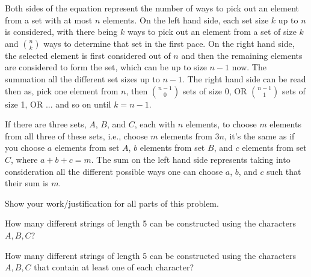 \documentclass[11pt]{article}
\begin{document}
\begin{solution}
    \begin{Parts}
        
        \Part Both sides of the equation represent the number of ways to pick out
        an element from a set with at most $n$ elements. On the left hand side, 
        each set size $k$ up to $n$ is considered, with there being $k$ ways to
        pick out an element from a set of size $k$ and $\binom{n}{k}$ ways to 
        determine that set in the first pace. On the right hand side, the selected
        element is first considered out of $n$ and then the remaining elements are
        considered to form the set, which can be up to size $n-1$ now. The
        summation all the different set sizes up to $n-1$. The right hand side can
        be read then as, pick one element from $n$, then $\binom{n-1}{0}$ sets of
        size 0, OR $\binom{n-1}{1}$ sets of size 1, OR ... and so on until $k = n-1$.

        \Part If there are three sets, $A$, $B$, and $C$, each with $n$ elements, to
        choose $m$ elements from all three of these sets, i.e., choose $m$ elements
        from $3n$, it's the same as if you choose $a$ elements from set $A$, $b$ 
        elements from set $B$, and $c$ elements from set $C$, where $a + b + c = m$.
        The sum on the left hand side represents taking into consideration all the 
        different possible ways one can choose $a$, $b$, and $c$ such that their
        sum is $m$.

    \end{Parts}
\end{solution}


Show your work/justification for all parts of this problem.
\begin{Parts}
    \Part How many different strings of length 5 can be constructed using the 
    characters $A, B, C$?

    \Part How many different strings of length 5 can be constructed using the 
    characters $A, B, C$ that contain at least one of each character?

\end{Parts}
\end{document}
